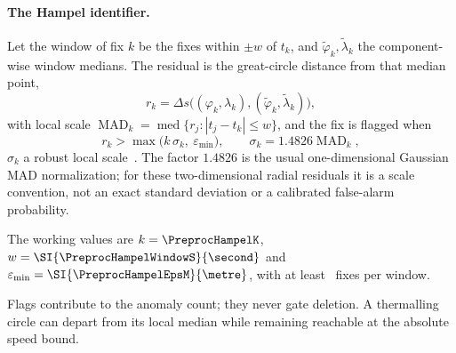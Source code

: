 \begin{revblock}
\paragraph{The Hampel identifier.}
Let the window of fix $k$ be the fixes within $\pm w$ of $t_k$, and
$\tilde\varphi_k,\tilde\lambda_k$ the component-wise window medians. The residual is the
great-circle distance from that median point,
\begin{equation}
\label{eq:hampelresid}
  r_k=\Delta s\big((\varphi_k,\lambda_k),(\tilde\varphi_k,\tilde\lambda_k)\big),
\end{equation}
with local scale $\operatorname{MAD}_k=\operatorname{med}\{r_j:|t_j-t_k|\le w\}$, and the
fix is flagged when
\begin{equation}
\label{eq:hampel}
  r_k > \max\!\big(k\,\sigma_k,\ \varepsilon_{\min}\big),
  \qquad \sigma_k = 1.4826\operatorname{MAD}_k,
\end{equation}
$\sigma_k$ a robust local scale~\cite{rousseeuw1993}. The factor $1.4826$ is the
usual one-dimensional Gaussian MAD normalization; for these two-dimensional radial
residuals it is a scale convention, not an exact standard deviation or a calibrated
false-alarm probability.

The working values are $k=\PreprocHampelK$,
$w=\SI{\PreprocHampelWindowS}{\second}$ and
$\varepsilon_{\min}=\SI{\PreprocHampelEpsM}{\metre}$, with at least
\PreprocHampelMinFixes\ fixes per window.

Flags contribute to the anomaly count;
they never gate deletion. A thermalling circle can depart from its local median
while remaining reachable at the absolute speed bound.

\end{revblock}

